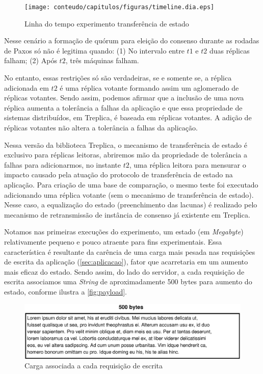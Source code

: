 \begin{figure}[ht]
  \centering
  \texttt{[image: conteudo/capitulos/figuras/timeline.dia.eps]}
  \caption{Linha do tempo experimento transferência de estado}
  \label{fig:timeline}
\end{figure}

Nesse cenário a formação de quórum para eleição do consenso durante as rodadas de Paxos só
não é legitima quando: (1) No intervalo entre $t1$ e $t2$ duas réplicas falham; (2) Após
$t2$, três máquinas falham.

No entanto, essas restrições só são verdadeiras, se e somente se, a réplica adicionada em
$t2$ é uma réplica votante formando assim um aglomerado de réplicas votantes. Sendo assim,
podemos afirmar que a inclusão de uma nova réplica aumenta a tolerância a falhas da
aplicação e que essa propriedade de sistemas distribuídos, em Treplica, é baseada em
réplicas votantes. A adição de réplicas votantes não altera a tolerância a falhas da
aplicação.

Nessa versão da biblioteca Treplica, o mecanismo de transferência de estado é exclusivo
para réplicas leitoras, abriremos mão da propriedade de tolerância a falhas para
adicionarmos, no instante $t2$, uma réplica leitora para mensurar o impacto causado pela
atuação do protocolo de transferência de estado na aplicação. Para criação de uma base de
comparação, o mesmo teste foi executado adicionando uma réplica votante (sem o mecanismo
de transferência de estado). Nesse caso, a equalização do estado (preenchimento das
lacunas) é realizado pelo mecanismo de retransmissão de instância de consenso já existente
em Treplica.

Notamos nas primeiras execuções do experimento, um estado (em \emph{Megabyte})
relativamente pequeno e pouco atraente para fins experimentais. Essa característica é
resultante da carência de uma carga mais pesada nas requisições de escrita da aplicação
(\autoref{sec:aplicacao}), fator que acarretaria em um aumento mais eficaz do estado.
Sendo assim, do lado do servidor, a cada requisição de escrita associamos uma
\emph{String} de aproximadamente 500 bytes para aumento do estado, conforme ilustra a
\autoref{fig:payload}.

\begin{figure}[ht]
  \centering
  \includegraphics[width=12cm]{conteudo/capitulos/figuras/payload.dia.eps}
  \caption{Carga associada a cada requisição de escrita}
  \label{fig:payload}
\end{figure}

